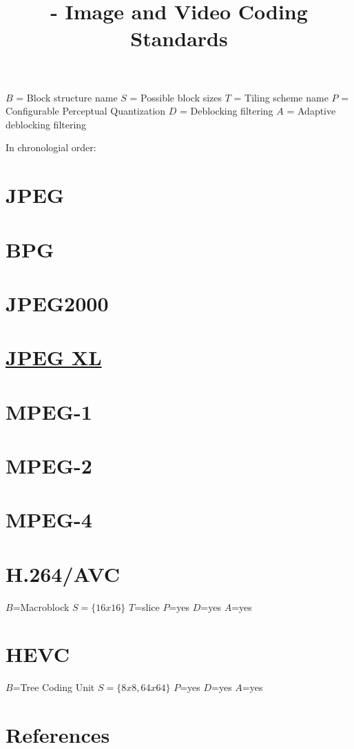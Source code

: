 
\title{\SM{} - Image and Video Coding Standards}

\maketitle

\tableofcontents

$B$ = Block structure name
$S$ = Possible block sizes
$T$ = Tiling scheme name
$P$ = Configurable Perceptual Quantization
$D$ = Deblocking filtering
$A$ = Adaptive deblocking filtering

In chronologial order:

\section{JPEG}

\section{BPG}

\section{JPEG2000}

\section{ \href{https://en.wikipedia.org/wiki/JPEG_XL}{JPEG XL}}

\section{MPEG-1}

\section{MPEG-2}

\section{MPEG-4}

\section{H.264/AVC}

$B$=Macroblock
$S=\{16x16\}$
$T$=slice
$P$=yes
$D$=yes
$A$=yes

\section{HEVC}

$B$=Tree Coding Unit
$S=\{8x8, 64x64\}$
$P$=yes
$D$=yes
$A$=yes

\section{References}

\renewcommand{\addcontentsline}[3]{}%


